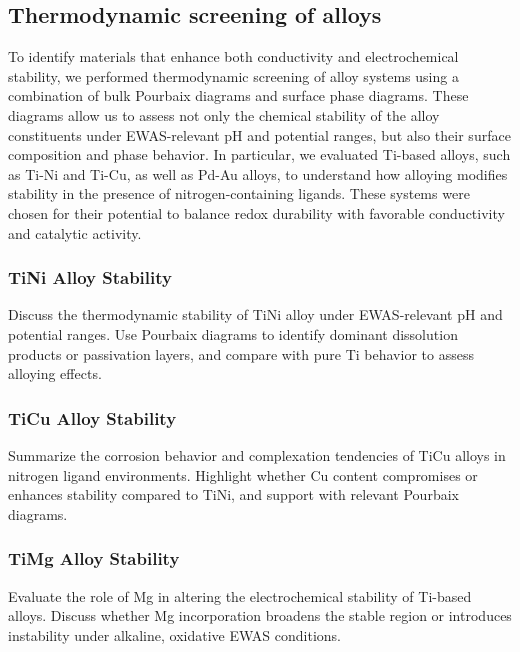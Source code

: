 \documentclass[journal=jacsat,manuscript=article]{achemso}
\begin{document}
\subsection{Thermodynamic screening of alloys}

To identify materials that enhance both conductivity and electrochemical stability, we performed thermodynamic screening of alloy systems using a combination of bulk Pourbaix diagrams and surface phase diagrams. These diagrams allow us to assess not only the chemical stability of the alloy constituents under EWAS-relevant pH and potential ranges, but also their surface composition and phase behavior. In particular, we evaluated Ti-based alloys, such as Ti-Ni and Ti-Cu, as well as Pd-Au alloys, to understand how alloying modifies stability in the presence of nitrogen-containing ligands. These systems were chosen for their potential to balance redox durability with favorable conductivity and catalytic activity.

\subsubsection{TiNi Alloy Stability}
Discuss the thermodynamic stability of TiNi alloy under EWAS-relevant pH and potential ranges. Use Pourbaix diagrams to identify dominant dissolution products or passivation layers, and compare with pure Ti behavior to assess alloying effects.

\subsubsection{TiCu Alloy Stability}
Summarize the corrosion behavior and complexation tendencies of TiCu alloys in nitrogen ligand environments. Highlight whether Cu content compromises or enhances stability compared to TiNi, and support with relevant Pourbaix diagrams.

\subsubsection{TiMg Alloy Stability}
Evaluate the role of Mg in altering the electrochemical stability of Ti-based alloys. Discuss whether Mg incorporation broadens the stable region or introduces instability under alkaline, oxidative EWAS conditions.

\end{document}

